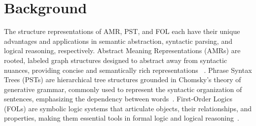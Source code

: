\section{Background}
The structure representations of AMR, PST, and FOL each have their unique advantages and applications in semantic abstraction, syntactic parsing, and logical reasoning, respectively. Abstract Meaning Representations (AMRs) are rooted, labeled graph structures designed to abstract away from syntactic nuances, providing concise and semantically rich representations ~\citep{banarescu2013abstract}. Phrase Syntax Trees (PSTs) are hierarchical tree structures grounded in Chomsky’s theory of generative grammar, commonly used to represent the syntactic organization of sentences, emphasizing the dependency between words~\citep{chomsky2014aspects}. First-Order Logics (FOLs) are symbolic logic systems that articulate objects, their relationships, and properties, making them essential tools in formal logic and logical reasoning~\citep{enderton2001mathematical, BARWISE19775}. 
